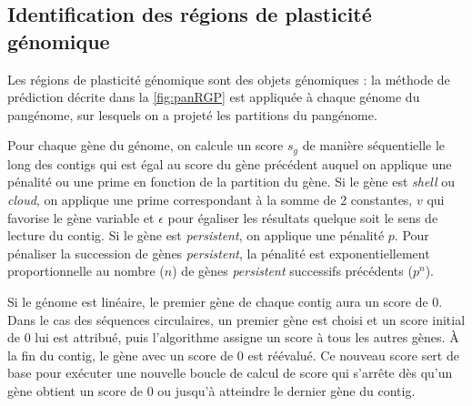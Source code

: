 \subsection{Identification des régions de plasticité génomique}

Les régions de plasticité génomique sont des objets génomiques : la méthode de prédiction décrite dans la \autoref{fig:panRGP} est appliquée à chaque génome du pangénome, sur lesquels on a projeté les partitions du pangénome.

Pour chaque gène du génome, on calcule un score $s_g$ de manière séquentielle le long des contigs qui est égal au score du gène précédent auquel on applique une pénalité ou une prime en fonction de la partition du gène. Si le gène est \textit{shell} ou \textit{cloud}, on applique une prime correspondant à la somme de 2 constantes, $v$ qui favorise le gène variable et $\epsilon$ pour égaliser les résultats quelque soit le sens de lecture du contig. Si le gène est \textit{persistent}, on applique une pénalité $p$. Pour pénaliser la succession de gènes \textit{persistent}, la pénalité est exponentiellement proportionnelle au nombre ($n$) de gènes \textit{persistent} successifs précédents ($p^n$).   

Si le génome est linéaire, le premier gène de chaque contig aura un score de 0. Dans le cas des séquences circulaires, un premier gène est choisi et un score initial de 0 lui est attribué, puis l’algorithme assigne un score à tous les autres gènes. À la fin du contig, le gène avec un score de 0 est réévalué. Ce nouveau score sert de base pour exécuter une nouvelle boucle de calcul de score qui s'arrête dès qu'un gène obtient un score de 0 ou jusqu’à atteindre le dernier gène du contig.

